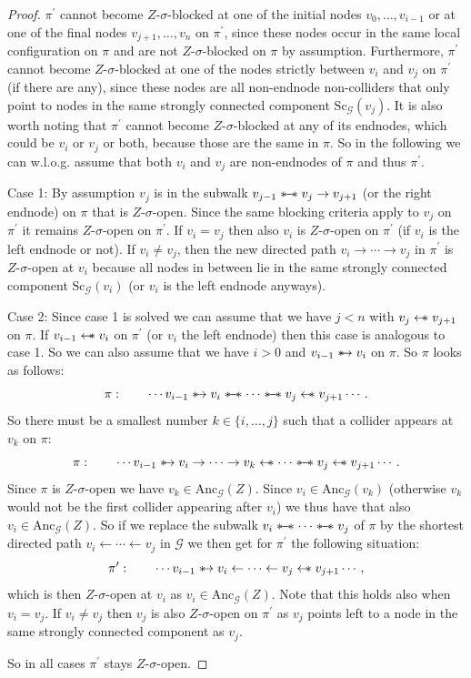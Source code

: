 \documentclass[10pt,a4paper]{amsart}
\newcommand{\hus}{\mathrel{{\leftarrow\mkern-11mu\ast}}}
\newcommand{\hut}{\mathrel{\leftarrow}}
\newcommand{\suh}{\mathrel{{\ast\mkern-11mu\to}}}
\newcommand{\sus}{\mathrel{{\ast\mkern-11mu\relbar\mkern-9mu\relbar\mkern-11mu\ast}}}
\newcommand{\tuh}{\mathrel{\rightarrow}}
\begin{document}
\begin{proof}
$\pi^{\prime}$ cannot become $Z$-$\sigma$-blocked at one of the initial nodes $v_{0},\ldots,v_{i-1}$ or at one of the final nodes $v_{j+1},\ldots,v_{n}$ on $\pi^{\prime}$, since these nodes occur in the same local configuration on $\pi$ and are not $Z$-$\sigma$-blocked on $\pi$ by assumption. Furthermore, $\pi^{\prime}$ cannot become $Z$-$\sigma$-blocked at one of the nodes strictly between $v_{i}$ and $v_{j}$ on $\pi^{\prime}$ (if there are any), since these nodes are all non-endnode non-colliders that only point to nodes in the same strongly connected component $\mathrm{Sc}_\mathcal{G}(v_{j})$. It is also worth noting that $\pi^{\prime}$ cannot become $Z$-$\sigma$-blocked at any of its endnodes, which could be $v_{i}$ or $v_{j}$ or both, because those are the same in $\pi$. So in the following we can w.l.o.g. assume that both $v_{i}$ and $v_{j}$ are non-endnodes of $\pi$ and thus $\pi^{\prime}$.

Case 1: By assumption $v_{j}$ is in the subwalk $v_{j-1}\sus v_j\tuh v_{j+1}$ (or the right endnode) on $\pi$ that is $Z$-$\sigma$-open. Since the same blocking criteria apply to $v_{j}$ on $\pi^{\prime}$ it remains $Z$-$\sigma$-open on $\pi^{\prime}$. If $v_{i}=v_{j}$ then also $v_{i}$ is $Z$-$\sigma$-open on $\pi^{\prime}$ (if $v_{i}$ is the left endnode or not). If $v_{i}\neq v_{j}$, then the new directed path $v_{i}\tuh\cdots\tuh v_{j}$ in $\pi^{\prime}$ is $Z$-$\sigma$-open at $v_{i}$ because all nodes in between lie in the same strongly connected component $\mathrm{Sc}_\mathcal{G}(v_{i})$ (or $v_{i}$ is the left endnode anyways).

Case 2: Since case 1 is solved we can assume that we have $j<n$ with $v_{j}\hus v_{j+1}$ on $\pi$. If $v_{i-1}\hus v_{i}$ on $\pi^{\prime}$ (or $v_{i}$ the left endnode) then this case is analogous to case 1. So we can also assume that we have $i>0$ and $v_{i-1}\suh v_{i}$ on $\pi$. So $\pi$ looks as follows:
\[
\pi:\qquad\cdots v_{i-1}\suh v_{i}\sus\cdots \sus v_{j}\hus v_{j+1}\cdots.
\]
So there must be a smallest number $k\in\{i,\ldots,j\}$ such that a collider appears at $v_{k}$ on $\pi$:
\[
\pi:\qquad\cdots v_{i-1}\suh v_{i}\tuh\cdots \tuh v_{k}\hus\cdots\sus v_{j}\hus v_{j+1}\cdots.
\]
Since $\pi$ is $Z$-$\sigma$-open we have $v_{k}\in\mathrm{Anc}_\mathcal{G}(Z)$. Since $v_{i}\in\mathrm{Anc}_\mathcal{G}(v_{k})$ (otherwise $v_{k}$ would not be the first collider appearing after $v_{i}$) we thus have that also $v_{i}\in\mathrm{Anc}_\mathcal{G}(Z)$. So if we replace the subwalk $v_{i}\sus\cdots\sus v_{j}$ of $\pi$ by the shortest directed path $v_{i}\hut\cdots\hut v_{j}$ in $\mathcal{G}$ we then get for $\pi^{\prime}$ the following situation:
\[
\pi^{\prime}:\qquad\cdots v_{i-1}\suh v_{i}\hut\cdots \hut v_{j}\hus v_{j+1}\cdots,
\]
which is then $Z$-$\sigma$-open at $v_{i}$ as $v_{i}\in\mathrm{Anc}_\mathcal{G}(Z)$. Note that this holds also when $v_{i}=v_{j}$. If $v_{i}\neq v_{j}$ then $v_{j}$ is also $Z$-$\sigma$-open on $\pi^{\prime}$ as $v_{j}$ points left to a node in the same strongly connected component as $v_{j}$.

So in all cases $\pi^{\prime}$ stays $Z$-$\sigma$-open.
\end{proof}
\end{document}
